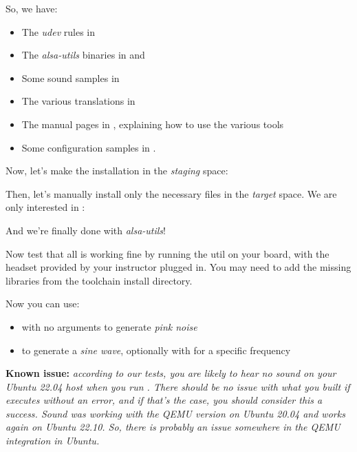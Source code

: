 So, we have:
\begin{itemize}
\item The {\em udev} rules in 
\item The {\em alsa-utils} binaries in  and 
\item Some sound samples in 
\item The various translations in 
\item The manual pages in , explaining how to
  use the various tools
\item Some configuration samples in .
\end{itemize}

Now, let's make the installation in the {\em staging} space:


Then, let's manually install only the necessary files in the {\em target}
space. We are only interested in :


And we're finally done with {\em alsa-utils}!

Now test that all is working fine by running the  util on
your board, with the headset provided by your instructor plugged
in. You may need to add the missing libraries from the toolchain
install directory.

Now you can use:

\begin{itemize}

\item {} with no arguments to generate {\em pink noise}

\item {} to generate a {\em sine wave},
optionally with  for a specific frequency

\end{itemize}

{\bf Known issue:} {\em according to our tests, you are likely to hear no
sound on your Ubuntu 22.04 host when you run . There should be no
issue with what you built if  executes without an
error, and if that's the case, you should consider this a success.
Sound was working with the QEMU version on Ubuntu 20.04 and works
again on Ubuntu 22.10. So, there is probably an issue somewhere in the QEMU
integration in Ubuntu.}

